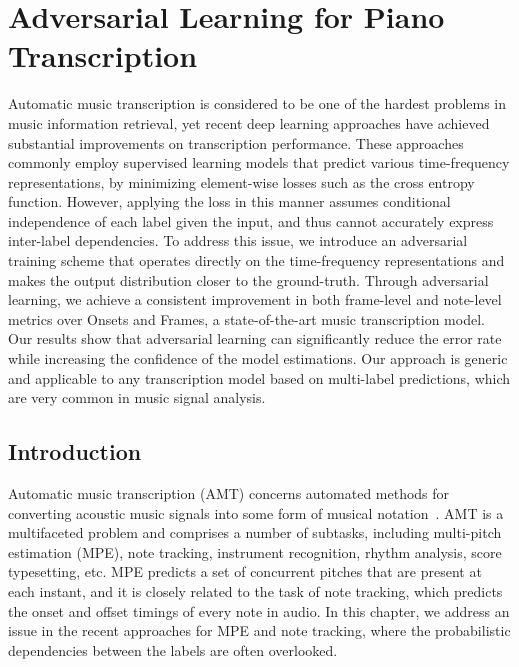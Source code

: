 
\graphicspath{{6-adversarial/figures/}}

\chapter{Adversarial Learning for Piano Transcription}
\label{ch:adversarial}


Automatic music transcription is considered to be one of the hardest problems in music information retrieval, yet recent deep learning approaches have achieved substantial improvements on transcription performance.
These approaches commonly employ supervised learning models that predict various time-frequency representations, by minimizing element-wise losses such as the cross entropy function.
However, applying the loss in this manner assumes conditional independence of each label given the input, and thus cannot accurately express inter-label dependencies.
To address this issue, we introduce an adversarial training scheme that operates directly on the time-frequency representations and makes the output distribution closer to the ground-truth.
Through adversarial learning, we achieve a consistent improvement in both frame-level and note-level metrics over Onsets and Frames, a state-of-the-art music transcription model.
Our results show that adversarial learning can significantly reduce the error rate while increasing the confidence of the model estimations.
Our approach is generic and applicable to any transcription model based on multi-label predictions, which are very common in music signal analysis.



\section{Introduction}\label{sec:introduction}

Automatic music transcription (AMT) concerns automated methods for converting acoustic music signals into some form of musical notation~\cite{benetos2013amt}.
AMT is a multifaceted problem and comprises a number of subtasks, including multi-pitch estimation (MPE), note tracking, instrument recognition, rhythm analysis, score typesetting, etc.
MPE predicts a set of concurrent pitches that are present at each instant, and it is closely related to the task of note tracking, which predicts the onset and offset timings of every note in audio.
In this chapter, we address an issue in the recent approaches for MPE and note tracking, where the probabilistic dependencies between the labels are often overlooked.

